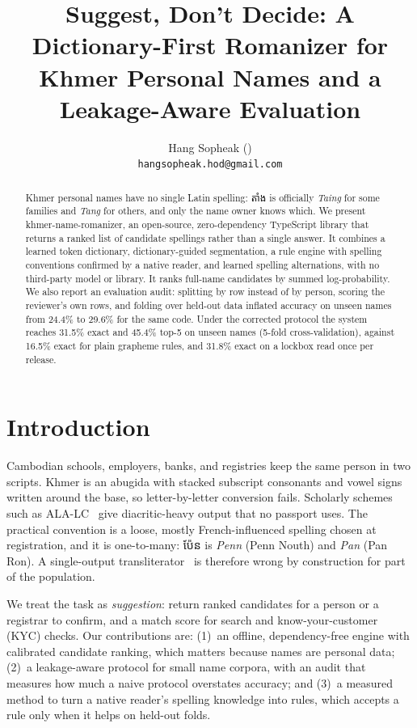 \documentclass[10pt,twocolumn,a4paper]{article}
\title{\vspace{-1.2cm}\bfseries Suggest, Don't Decide: A Dictionary-First Romanizer for\\
Khmer Personal Names and a Leakage-Aware Evaluation}
\author{Hang Sopheak (\kh{ហង្ស សុភ័ក្រ្ត})\\
\small \texttt{hangsopheak.hod@gmail.com}}
\date{\vspace{-0.9cm}}
\newcommand{\kh}[1]{{\khmerfont #1}}
\begin{document}
\maketitle

\begin{abstract}
\noindent
Khmer personal names have no single Latin spelling: \kh{តាំង} is
officially \emph{Taing} for some families and \emph{Tang} for others, and
only the name owner knows which. We present \textsf{khmer-name-romanizer},
an open-source, zero-dependency TypeScript library that returns a ranked
list of candidate spellings rather than a single answer. It combines a
learned token dictionary, dictionary-guided segmentation, a rule engine
with spelling conventions confirmed by a native reader, and learned
spelling alternations, with no third-party model or library. It ranks full-name candidates by summed log-probability. We
also report an evaluation audit: splitting by row instead of by person,
scoring the reviewer's own rows, and folding over held-out data inflated
accuracy on unseen names from 24.4\% to 29.6\% for the same code. Under
the corrected protocol the system reaches 31.5\% exact and 45.4\% top-5
on unseen names (5-fold cross-validation), against 16.5\% exact for
plain grapheme rules, and 31.8\% exact on a lockbox read once per
release.
\end{abstract}

\section{Introduction}
Cambodian schools, employers, banks, and registries keep the same person
in two scripts. Khmer is an abugida with stacked subscript consonants and
vowel signs written around the base, so letter-by-letter conversion fails.
Scholarly schemes such as ALA-LC~\cite{alalc_khmer} give diacritic-heavy
output that no passport uses. The practical convention is a loose, mostly
French-influenced spelling chosen at registration, and it is one-to-many:
\kh{ប៉ែន} is \emph{Penn} (Penn Nouth) and \emph{Pan} (Pan Ron).
A single-output transliterator~\cite{knight1998machine,li2009news} is
therefore wrong by construction for part of the population.

We treat the task as \emph{suggestion}: return ranked candidates for a
person or a registrar to confirm, and a match score for search and
know-your-customer (KYC) checks. Our contributions are: (1)~an offline,
dependency-free engine with calibrated candidate ranking, which matters
because names are personal data; (2)~a leakage-aware protocol for small
name corpora, with an audit that measures how much a naive protocol
overstates accuracy; and (3)~a measured method to turn a native reader's
spelling knowledge into rules, which accepts a rule only when it helps
on held-out folds.
\end{document}
